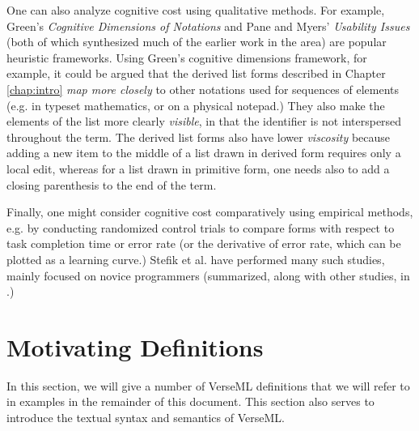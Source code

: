 One can also analyze cognitive cost using qualitative methods. For example, Green's \emph{Cognitive Dimensions of Notations} \cite{Green89,green1996usability} and Pane and Myers' \emph{Usability Issues} \cite{pane1996usability} (both of which synthesized much of the earlier work in the area) are popular heuristic frameworks. Using Green's cognitive dimensions framework, for example, it could be argued that the derived list forms described in Chapter \ref{chap:intro} \emph{map more closely} to other notations used for sequences of elements (e.g. in typeset mathematics, or on a physical notepad.) They also make the elements of the list more clearly \emph{visible}, in that the identifier  is not interspersed throughout the term. The derived list forms also have lower \emph{viscosity} because adding a new item to the middle of a list drawn in derived form requires only a local edit, whereas for a list drawn in primitive form, one needs also to add a closing parenthesis to the end of the term.

Finally, one might consider cognitive cost comparatively using empirical methods, e.g. by conducting randomized control trials to compare forms with respect to task completion time or error rate (or the derivative of error rate, which can be plotted as a {learning curve}.) Stefik et al. have performed many such studies, mainly focused on novice programmers (summarized, along with other studies, in \cite{journals/jeric/StefikS13}.)




\section{Motivating Definitions}\label{sec:motivating-examples}
In this section, we will give a number of VerseML definitions that we will refer to in examples in the remainder of this document. This section also serves to introduce the textual syntax and semantics of VerseML.

